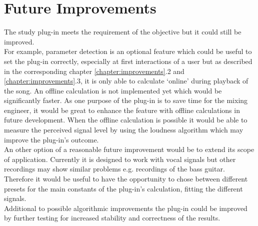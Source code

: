 \chapter{Future Improvements}
\label{chapter:future_improvements}

The study plug-in meets the requirement of the objective but it could still be improved.\\
For example, parameter detection is an optional feature which could be useful to set the plug-in correctly, especially at first interactions of a user but as described in the corresponding chapter \ref{chapter:improvements}.2 and \ref{chapter:improvements}.3, it is only able to calculate ‘online’ during playback of the song. An offline calculation is not implemented yet which would be significantly faster. As one purpose of the plug-in is to save time for the mixing engineer, it would be great to enhance the feature with offline calculations in future development. When the offline calculation is possible it would be able to measure the perceived signal level by using the loudness algorithm\cite{ITUalgo} which may improve the plug-in’s outcome.\\
An other option of a reasonable future improvement would be to extend its scope of application. Currently it is designed to work with vocal signals but other recordings may show similar problems e.g. recordings of the bass guitar. Therefore it would be useful to have the opportunity to chose between different presets for the main constants of the plug-in’s calculation, fitting the different signals.\\
Additional to possible algorithmic improvements the plug-in could be improved by further testing for increased stability and correctness of the results.\\


